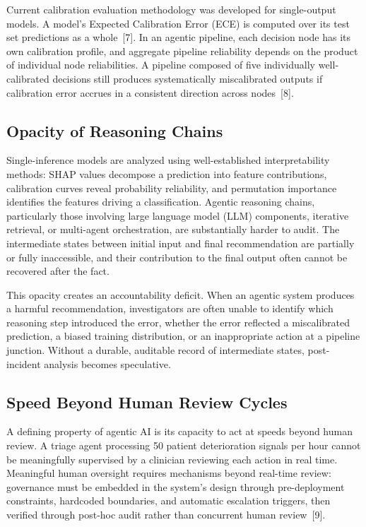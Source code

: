 \documentclass[11pt]{article}
\begin{document}
Current calibration evaluation methodology was developed for
single-output models. A model's Expected Calibration Error (ECE) is
computed over its test set predictions as a whole~{[}7{]}. In an agentic
pipeline, each decision node has its own calibration profile, and
aggregate pipeline reliability depends on the product of individual node
reliabilities. A pipeline composed of five individually well-calibrated
decisions still produces systematically miscalibrated outputs if
calibration error accrues in a consistent direction across nodes~{[}8{]}.

\subsection{Opacity of Reasoning
Chains}\label{opacity-of-reasoning-chains}

Single-inference models are analyzed using well-established
interpretability methods: SHAP values decompose a prediction into
feature contributions, calibration curves reveal probability
reliability, and permutation importance identifies the features driving
a classification. Agentic reasoning chains, particularly those involving
large language model (LLM) components, iterative retrieval, or
multi-agent orchestration, are substantially harder to audit. The
intermediate states between initial input and final recommendation are
partially or fully inaccessible, and their contribution to the final
output often cannot be recovered after the fact.

This opacity creates an accountability deficit. When an agentic system
produces a harmful recommendation, investigators are often unable to
identify which reasoning step introduced the error, whether the error
reflected a miscalibrated prediction, a biased training distribution, or
an inappropriate action at a pipeline junction. Without a durable,
auditable record of intermediate states, post-incident analysis becomes
speculative.

\subsection{Speed Beyond Human Review
Cycles}\label{speed-beyond-human-review-cycles}

A defining property of agentic AI is its capacity to act at speeds
beyond human review. A triage agent processing 50 patient deterioration
signals per hour cannot be meaningfully supervised by a clinician
reviewing each action in real time. Meaningful human oversight requires
mechanisms beyond real-time review: governance must be embedded in the
system's design through pre-deployment constraints, hardcoded
boundaries, and automatic escalation triggers, then verified through
post-hoc audit rather than concurrent human review~{[}9{]}.
\end{document}
